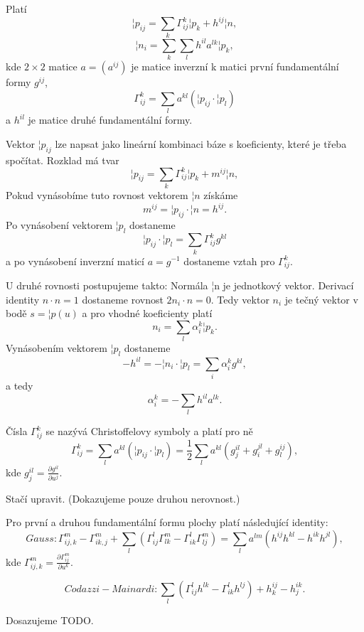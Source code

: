 \documentclass[12pt]{article}                   %
\begin{document}
        \begin{veta}
            Platí
            $$ ¦p_{ij} = \sum_k \Gamma_{ij}^k ¦p_k + h^{ij}¦n, $$
            $$ ¦n_i = \sum_k\sum_l h^{il}a^{lk}¦p_k, $$
            kde $2 \times 2$ matice $a = (a^{ij})$ je matice inverzní k matici první fundamentální formy $g^{ij}$,
            $$ \Gamma_{ij}^k = \sum_l a^{kl}(¦p_{ij}·¦p_l) $$
            a $h^{il}$ je matice druhé fundamentální formy.

            \begin{dukazin}
                Vektor $¦p_{ij}$ lze napsat jako lineární kombinaci báze s koeficienty, které je třeba spočítat. Rozklad má tvar
                $$ ¦p_{ij} = \sum_k \Gamma_{ij}^k¦p_k + m^{ij}¦n, $$ 
                Pokud vynásobíme tuto rovnost vektorem $¦n$ získáme
                $$ m^{ij} = ¦p_{ij}·¦n = h^{ij}. $$
                Po vynásobení vektorem $¦p_l$ dostaneme
                $$ ¦p_{ij}·¦p_l = \sum_k \Gamma_{ij}^kg^{kl} $$
                a po vynásobení inverzní maticí $a = g^{-1}$ dostaneme vztah pro $\Gamma_{ij}^k$.

                U druhé rovnosti postupujeme takto: Normála ¦n je jednotkový vektor. Derivací identity $n·n = 1$ dostaneme rovnost $2n_i·n = 0$. Tedy vektor $n_i$ je tečný vektor v bodě $s = ¦p(u)$ a pro vhodné koeficienty platí
                $$ n_i = \sum_l \alpha_i^k¦p_k. $$
                Vynásobením vektorem $¦p_l$ dostaneme
                $$ -h^{il} = -¦n_i·¦p_l = \sum_i \alpha_i^k g^{kl}, $$
                a tedy
                $$ \alpha_i^k = -\sum_lh^{il}a^{lk}. $$ 
            \end{dukazin}
        \end{veta}

        \begin{lemma}
            Čísla $\Gamma_{ij}^k$ se nazývá Christoffelovy symboly a platí pro ně
            $$ \Gamma_{ij}^k = \sum_l a^{kl}(¦p_{ij}·¦p_l) = \frac{1}{2} \sum_l a^{kl}(g^{il}_j + g^{jl}_i + g^{ij}_l), $$
            kde $g^{il}_j = \frac{\partial g^{il}}{\partial u^j}$.

            \begin{dukazin}
                Stačí upravit. (Dokazujeme pouze druhou nerovnost.)
            \end{dukazin}
        \end{lemma}

        \begin{veta}
            Pro první a druhou fundamentální formu plochy platí následující identity:
            $$ Gauss: \Gamma_{ij,k}^m - \Gamma_{ik,j}^m + \sum_l(\Gamma_{ij}^l\Gamma_{lk}^m - \Gamma_{ik}^l\Gamma_{lj}^m) = \sum_l a^{lm} (h^{ij}h^{kl} - h^{ik}h^{jl}), $$
            kde $\Gamma_{ij,k}^m = \frac{\partial \Gamma_{ij}^m}{\partial u^k}$.

            $$ Codazzi-Mainardi: \sum_l(\Gamma_{ij}^lh^{lk} - \Gamma_{ik}^lh^{lj}) + h^{ij}_{k} - h^{ik}_j. $$

            \begin{dukazin}
                Dosazujeme TODO.
            \end{dukazin}
        \end{veta}
\end{document}

